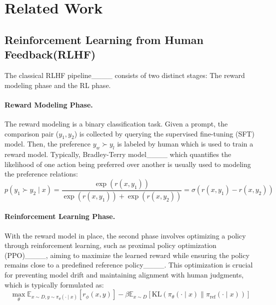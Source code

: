 \section{Related Work}
\subsection{Reinforcement Learning from Human Feedback(RLHF)}

The classical RLHF pipeline____ consists of two distinct stages: The reward modeling phase and the RL phase.

\vspace{-0.25cm}
\paragraph{Reward Modeling Phase.}The reward modeling is a binary classification task. Given a prompt, the comparison pair ($y_1, y_2$) is collected by querying the supervised fine-tuning (SFT) model. Then, the preference $y_w \succ y_l$ is labeled by human which is used to train a reward model. Typically, Bradley-Terry model____ which quantifies the likelihood of one action being preferred over another is usually used to modeling the preference relations:
\begin{equation}
    p\left(y_1 \succ y_2 \mid x\right)=\frac{\exp \left(r\left(x, y_1\right)\right)}{\exp \left(r\left(x, y_1\right)\right)+\exp \left(r\left(x, y_2\right)\right)}=\sigma\left(r\left(x, y_1\right)-r\left(x, y_2\right)\right)
\end{equation}

\vspace{-0.25cm}
\paragraph{Reinforcement Learning Phase.} With the reward model in place, the second phase involves optimizing a policy through reinforcement learning, such as proximal policy optimization (PPO)____, aiming to maximize the learned reward while ensuring the policy remains close to a predefined reference policy____. This optimization is crucial for preventing model drift and maintaining alignment with human judgments, which is typically formulated as:
\begin{equation}
    \max _\theta \mathbb{E}_{x \sim D, y \sim \pi_\theta(\cdot \mid x)}\left[r_\phi(x, y)\right]-\beta \mathbb{E}_{x \sim D}\left[\mathrm{KL}\left(\pi_\theta(\cdot \mid x) \| \pi_{\operatorname{ref}}(\cdot \mid x)\right)\right]
\end{equation}

